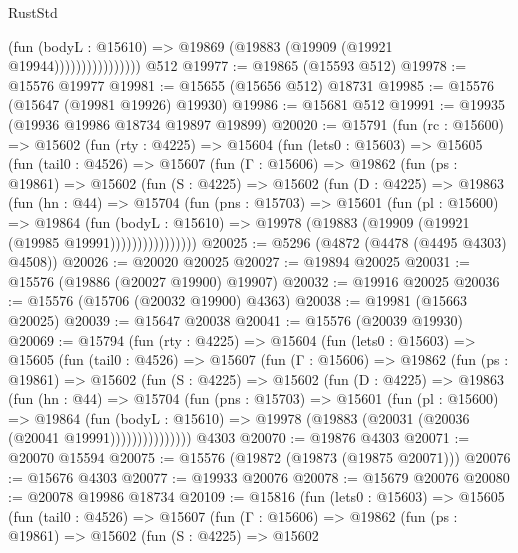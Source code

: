 \begin{lexlean}{RustStd}
\begin{coremodule}
                            (fun (bodyL : @15610) =>
                            @19869 (@19883 (@19909 (@19921 @19944))))))))))))))))
    @512
@19977 := @19865 (@15593 @512)
@19978 := @15576 @19977
@19981 := @15655 (@15656 @512) @18731
@19985 := @15576 (@15647 (@19981 @19926) @19930)
@19986 := @15681 @512
@19991 := @19935 (@19936 @19986 @18734 @19897 @19899)
@20020 := @15791
    (fun (rc : @15600) =>
    @15602
      (fun (rty : @4225) =>
      @15604
        (fun (lets0 : @15603) =>
        @15605
          (fun (tail0 : @4526) =>
          @15607
            (fun (Γ : @15606) =>
            @19862
              (fun (ps : @19861) =>
              @15602
                (fun (S : @4225) =>
                @15602
                  (fun (D : @4225) =>
                  @19863
                    (fun (hn : @44) =>
                    @15704
                      (fun (pns : @15703) =>
                      @15601
                        (fun (pl : @15600) =>
                        @19864
                          (fun (bodyL : @15610) =>
                          @19978 (@19883 (@19909 (@19921 (@19985 @19991))))))))))))))))
@20025 := @5296 (@4872 (@4478 (@4495 @4303) @4508))
@20026 := @20020 @20025
@20027 := @19894 @20025
@20031 := @15576 (@19886 (@20027 @19900) @19907)
@20032 := @19916 @20025
@20036 := @15576 (@15706 (@20032 @19900) @4363)
@20038 := @19981 (@15663 @20025)
@20039 := @15647 @20038
@20041 := @15576 (@20039 @19930)
@20069 := @15794
    (fun (rty : @4225) =>
    @15604
      (fun (lets0 : @15603) =>
      @15605
        (fun (tail0 : @4526) =>
        @15607
          (fun (Γ : @15606) =>
          @19862
            (fun (ps : @19861) =>
            @15602
              (fun (S : @4225) =>
              @15602
                (fun (D : @4225) =>
                @19863
                  (fun (hn : @44) =>
                  @15704
                    (fun (pns : @15703) =>
                    @15601
                      (fun (pl : @15600) =>
                      @19864
                        (fun (bodyL : @15610) =>
                        @19978 (@19883 (@20031 (@20036 (@20041 @19991)))))))))))))))
    @4303
@20070 := @19876 @4303
@20071 := @20070 @15594
@20075 := @15576 (@19872 (@19873 (@19875 @20071)))
@20076 := @15676 @4303
@20077 := @19933 @20076
@20078 := @15679 @20076
@20080 := @20078 @19986 @18734
@20109 := @15816
    (fun (lets0 : @15603) =>
    @15605
      (fun (tail0 : @4526) =>
      @15607
        (fun (Γ : @15606) =>
        @19862
          (fun (ps : @19861) =>
          @15602
            (fun (S : @4225) =>
            @15602

\end{coremodule}
\end{lexlean}
